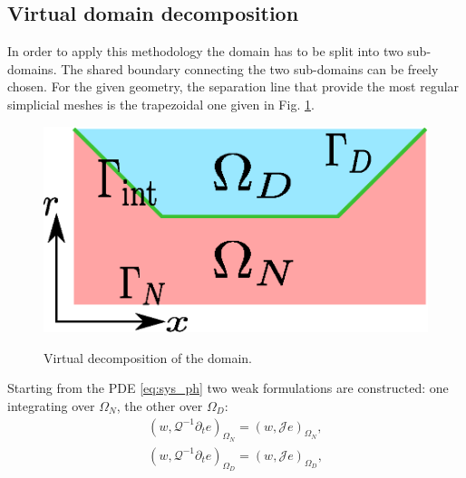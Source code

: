 \documentclass{ifacconf}
\begin{document}
\subsection{Virtual domain decomposition}
\label{sec:vdd}
In order to apply this methodology the domain has to be split into two sub-domains. The shared boundary connecting the two sub-domains can be freely chosen. For the given geometry, the separation line that provide the most regular simplicial meshes is the trapezoidal one given in Fig. \ref{fig:dom_dec}. 
\begin{figure}[t]%
	\centering
	\includegraphics[width=0.65\columnwidth]{domain_split.eps} \\
	\caption{Virtual decomposition of the domain.}
	\label{fig:dom_dec}
\end{figure}
Starting from the PDE \eqref{eq:sys_ph} two weak formulations are constructed: one integrating over $\Omega_N$, the other over $\Omega_D$:
\begin{align}
    \left(w, \mathcal{Q}^{-1} \partial_t{e} \right)_{\Omega_N} = \left(w, \mathcal{J} e \right)_{\Omega_{N}} \label{eq: wf_OmN}, \\
    \left(w, \mathcal{Q}^{-1} \partial_t{e} \right)_{\Omega_D} = \left(w, \mathcal{J} e \right)_{\Omega_{D}}, \label{eq: wf_OmD}
\end{align}
\end{document}
